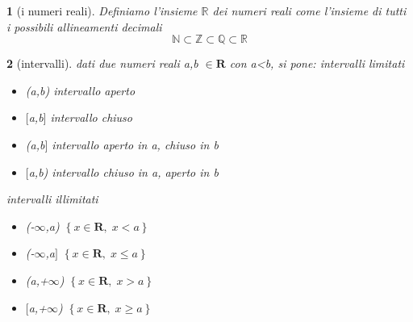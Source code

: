 \documentclass{article}
\theoremstyle{mystyle}
\newtheorem*{mydefinition}{}
\begin{document}
\begin{mydefinition}[i numeri reali]
    Definiamo l'insieme $\mathds{R}$ dei numeri reali come l'insieme di tutti i possibili allineamenti decimali
    $$\mathds{N}\subset\mathds{Z}\subset\mathds{Q}\subset\mathds{R}$$
\end{mydefinition}

 \begin{mydefinition}[intervalli]
     dati due numeri reali a,b $\in\mathbf{R}$ con a<b, si pone: \newline
     \textit{intervalli limitati}
     \begin{itemize} 
         \item (a,b) \hspace{3cm} intervallo \emph{aperto}
         \item $[$a,b$]$ \hspace{3cm} intervallo \emph{chiuso}
         \item (a,b$]$ \hspace{3cm} intervallo \emph{aperto in a, chiuso in b}
         \item $[$a,b) \hspace{3cm} intervallo \emph{chiuso in a, aperto in b}
     \end{itemize}
 \textit{intervalli illimitati}
     \begin{itemize} 
         \item (-$\infty$,a) \hspace{3cm} $\left \{ x\in \mathbf{R}, \; x<a\right \}$
         \item (-$\infty$,a$]$ \hspace{3cm} $\left \{ x\in \mathbf{R}, \; x\leq a\right \}$
         \item (a,+$\infty$) \hspace{2.87cm} $\left \{ x\in \mathbf{R}, \; x>a\right \}$
         \item $[$a,+$\infty$) \hspace{3cm} $\left \{ x\in \mathbf{R}, \; x\geq a\right \}$
     \end{itemize}
 
 \end{mydefinition}
\vspace{1cm}
\end{document}
